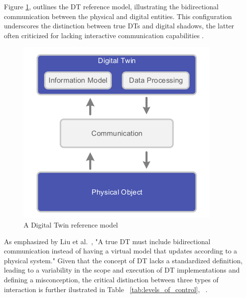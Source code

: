 Figure \ref{f:dt-structure}, \cite{dt_model} outlines the \ac{DT} reference model, illustrating the bidirectional communication between the physical 
and digital entities. This configuration underscores the distinction between true DTs and digital shadows, the latter often criticized for lacking 
interactive communication capabilities \cite{CIMINO2019103130}.

\begin{figure}[!htpb]
    \centering
    \includegraphics[width=0.4\linewidth]{figs/dt_reference_model.png}
    \caption{A Digital Twin reference model \cite{dt_model}}
    \label{f:dt-structure}
\end{figure}


As emphasized by Liu et al.~, "A true DT must include bidirectional communication instead of having a virtual model that updates
according to a physical system." 
Given that the concept of \ac{DT} lacks a standardized definition, leading to a variability in the scope and execution of \ac{DT} implementations and
defining a misconception, the critical distinction between three types of interaction is further ilustrated in Table ~\ref{tab:levels_of_control}, ~\cite{liu2022state}.

